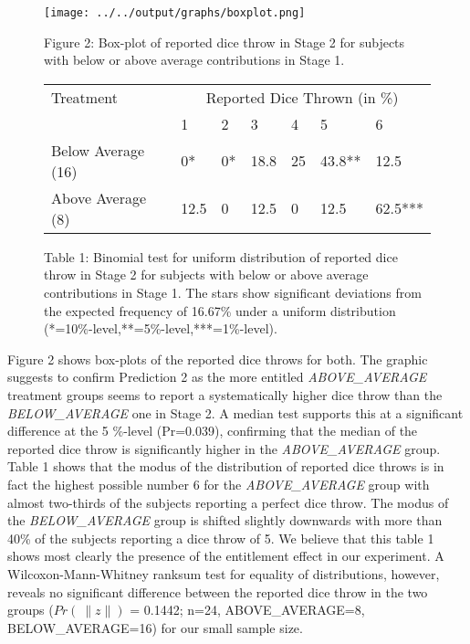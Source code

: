 \documentclass[12pt, a4paper]{article}
\begin{document}
\begin{figure}[!h]
\centering
\texttt{[image: ../../output/graphs/boxplot.png]}
\caption*{\footnotesize Figure 2: Box-plot of reported dice throw in Stage 2 for subjects with below or above average contributions in Stage 1.}

\vspace*{.5cm}
\begin{tabular}{lllllll}
\toprule
Treatment      & \multicolumn{6}{c}{Reported Dice Thrown (in \%)} \\
                        & 1       & 2     & 3       & 4     & 5         & 6 \\
                        \midrule
Below Average (16)   & 0*      & 0*    & 18.8    & 25    & 43.8**    & 12.5      \\
Above Average (8) & 12.5    & 0     & 12.5    & 0     & 12.5      & 62.5*** \\
\bottomrule
\end{tabular}
\caption*{\footnotesize Table 1: Binomial test for uniform distribution of reported dice throw in Stage 2 for subjects with below or above average contributions in Stage 1. The stars show significant deviations from the expected frequency of 16.67\% under a uniform distribution (*=10\%-level,**=5\%-level,***=1\%-level).}
\end{figure}

Figure 2 shows box-plots of the reported dice throws for both. The graphic suggests to confirm Prediction 2 as the more entitled \emph{ABOVE\_AVERAGE} treatment groups seems to report a systematically higher dice throw than the \emph{BELOW\_AVERAGE} one in Stage 2. A median test supports this at a significant difference at the 5 \%-level (Pr=0.039), confirming that the median of the reported dice throw is significantly higher in the \emph{ABOVE\_AVERAGE} group. Table 1 shows that the modus of the distribution of reported dice throws is in fact the highest possible number 6 for the \emph{ABOVE\_AVERAGE} group with almost two-thirds of the subjects reporting a perfect dice throw. The modus of the \emph{BELOW\_AVERAGE} group is shifted slightly downwards with more than 40\% of the subjects reporting a dice throw of 5. We believe that this table 1 shows most clearly the presence of the entitlement effect in our experiment. A Wilcoxon-Mann-Whitney ranksum test for equality of distributions, however, reveals no significant difference between the reported dice throw in the two groups ($Pr(\>\|z\|)$ = 0.1442; n=24, ABOVE\_AVERAGE=8, BELOW\_AVERAGE=16) for our small sample size.
\end{document}
